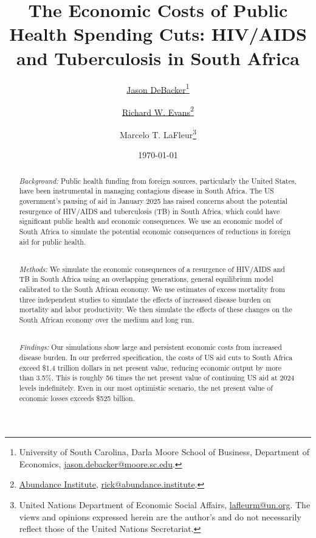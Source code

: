 \documentclass[letterpaper,12pt]{article}
\theoremstyle{definition}
\begin{document}
\begin{titlepage}
\title{The Economic Costs of Public Health Spending Cuts: HIV/AIDS and Tuberculosis in South Africa}
\date{\today}
\author{\href{http://jasondebacker.com/}{Jason DeBacker}\thanks{University of South Carolina, Darla Moore School of Business, Department of Economics, \href{mailto:jason.debacker@moore.sc.edu}{jason.debacker@moore.sc.edu}.}\and \href{https://sites.google.com/site/rickecon}{Richard W. Evans}\thanks{\href{https://abundance.institute/}{Abundance Institute}, \href{mailto:rick@abundance.institute}{rick@abundance.institute}.}\and {Marcelo T. LaFleur}\thanks{{United Nations Department of Economic Social Affairs}, \href{mailto:lafleurm@un.org}{lafleurm@un.org}. The views and opinions expressed herein are the author's and do not necessarily reflect those of the United Nations Secretariat.}}
\maketitle
\vspace{-2mm}
\begin{abstract}
\small{
\noindent \emph{Background:}
Public health funding from foreign sources, particularly the United States, have been instrumental in managing contagious disease in South Africa. The US government's pausing of aid in January 2025 has raised concerns about the potential resurgence of HIV/AIDS and tuberculosis (TB) in South Africa, which could have significant public health and economic consequences. We use an economic model of South Africa to simulate the potential economic consequences of reductions in foreign aid for public health.

\ \\
\emph{Methods:}
We simulate the economic consequences of a resurgence of HIV/AIDS and TB in South Africa using an overlapping generations, general equilibrium model calibrated to the South African economy. We use estimates of excess mortality from three independent studies to simulate the effects of increased disease burden on mortality and labor productivity. We then simulate the effects of these changes on the South African economy over the medium and long run.

\ \\
\emph{Findings:}
Our simulations show large and persistent economic costs from increased disease burden. In our preferred specification, the costs of US aid cuts to South Africa exceed \$1.4 trillion dollars in net present value, reducing economic output by more than 3.5\%. This is roughly 56 times the net present value of continuing US aid at 2024 levels indefinitely. Even in our most optimistic scenario, the net present value of economic losses exceeds \$525 billion.

}
\end{abstract}
\end{titlepage}
\end{document}
